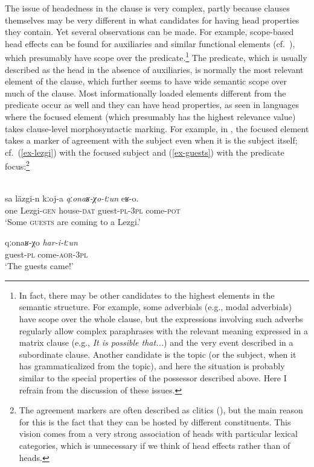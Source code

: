 \documentclass[output=paper,nobabel,draftmode  ,colorlinks, citecolor=brown]{langscibook}
\begin{document}
The issue of headedness in the clause is very complex, partly because clauses themselves may be very
different in what candidates for having head properties they contain. Yet several observations can
be made. For example, scope-based head effects can be found for auxiliaries and similar functional
elements (cf.\ \cite{Zwicky85a}), which presumably have scope over the predicate.\footnote{In fact,
  there may be other candidates to the highest elements in the semantic structure. For example, some
  adverbials (e.g., modal adverbials) have scope over the whole clause, but the expressions
  involving such adverbs regularly allow complex paraphrases with the relevant meaning expressed in
  a matrix clause (e.g., \emph{It is possible that...}) and the very event described in a
  subordinate clause. Another candidate is the topic (or the subject, when it has grammaticalized
  from the topic), and here the situation is probably similar to the special properties of the
  possessor described above. Here I refrain from the discussion of these issues.} The predicate,
which is usually described as the head in the absence of auxiliaries, is normally the most relevant
element of the clause, which further seems to have wide semantic scope over much of the clause. Most
informationally loaded elements different from the predicate occur as well and they can have head
properties, as seen in languages where the focused element (which presumably has the highest
relevance value) takes clause-level morphosyntactic marking. For example, in , the focused
element takes a marker of agreement with the subject even when it is the subject itself;
cf.\ (\ref{ex-lezgi}) with the focused subject and (\ref{ex-guests}) with the predicate
focus:\footnote{The  agreement markers are often described as clitics (\cite{Harris2002}), but
  the main reason for this is the fact that they can be hosted by different constituents. This
  vision comes from a very strong association of heads with particular lexical categories, which is
  unnecessary if we think of head effects rather than of heads.} 

\newpage
\ea
{}\\
\ea\label{ex-lezgi}
\gll sa	läzgi-n	kːoj-a  \emph{qːonaʁ-χo-tːun} eʁ-o.  \\ 
     one Lezgi-\textsc{gen}  house-\textsc{dat} guest-\textsc{pl-3pl}	come-\textsc{pot} \\
\glt `Some \textsc{guests} are coming to a Lezgi.'

\ex\label{ex-guests}
\gll qːonaʁ-χo	\emph{har-i-tːun}\\ guest-\textsc{pl} come-\textsc{aor-3pl} \\
\glt `The guests came!'
\z\z
\end{document}
